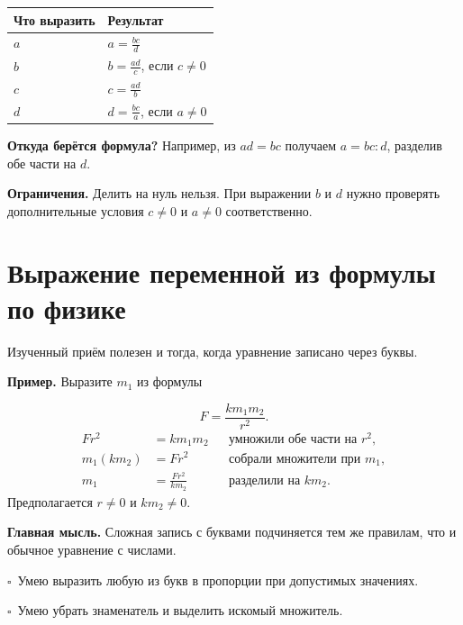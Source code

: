 \documentclass[a4paper,12pt]{article}
\newcommand{\keyidea}[1]{\textcolor{darkaccent}{\textbf{Главная мысль.}} #1}
\newcommand{\example}[1]{\par\medskip\textcolor{darkaccent}{\textbf{Пример.}} #1\par}
\newcommand{\checkmarkline}[1]{\par\smallskip\textcolor{darkaccent}{$\square$}\ #1\par}
\begin{document}
\begin{center}
\renewcommand{\arraystretch}{1.55}
\begin{tabular}{@{}ll@{}}
\toprule
\textcolor{darkaccent}{Что выразить} & \textcolor{darkaccent}{Результат}\\
\midrule
$a$ & $\displaystyle a=\frac{bc}{d}$\\
$b$ & $\displaystyle b=\frac{ad}{c}$, если $c\ne0$\\
$c$ & $\displaystyle c=\frac{ad}{b}$\\
$d$ & $\displaystyle d=\frac{bc}{a}$, если $a\ne0$\\
\bottomrule
\end{tabular}
\end{center}
\textbf{Откуда берётся формула?} Например, из $ad=bc$ получаем
$a=bc:d$, разделив обе части на $d$.

\textbf{Ограничения.} Делить на нуль нельзя. При выражении $b$ и $d$
нужно проверять дополнительные условия $c\ne0$ и $a\ne0$ соответственно.

\section{Выражение переменной из формулы по физике}
Изученный приём полезен и тогда, когда уравнение записано через буквы.

\example{Выразите $m_1$ из формулы}
\[
F=\frac{k m_1m_2}{r^2}.
\]
\begin{align*}
F r^2 &= k m_1m_2 &&\text{умножили обе части на $r^2$},\\
m_1(km_2)&=Fr^2 &&\text{собрали множители при $m_1$},\\
m_1&=\boxed{\frac{Fr^2}{km_2}} &&\text{разделили на $km_2$}.
\end{align*}
Предполагается $r\ne0$ и $km_2\ne0$.

\keyidea{Сложная запись с буквами подчиняется тем же правилам,
что и обычное уравнение с числами.}

\checkmarkline{Умею выразить любую из букв в пропорции при допустимых значениях.}
\checkmarkline{Умею убрать знаменатель и выделить искомый множитель.}
\end{document}
